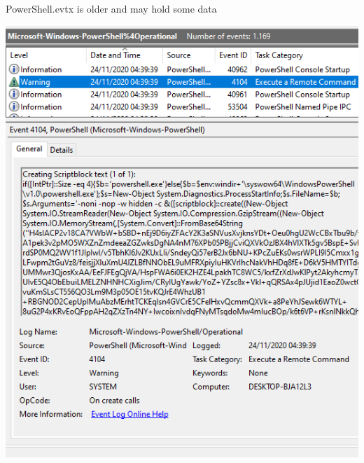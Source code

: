 PowerShell.evtx is older and may hold some data
\begin{center}
  \includegraphics[scale=0.5]{resources/05-event-logs.png}
\end{center}

